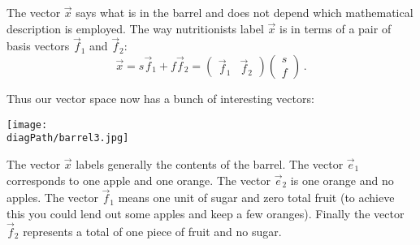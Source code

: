 {The vector $\vec x$ says what is in the barrel and does not depend which mathematical description is employed. The way nutritionists label $\vec x$ 
is in terms of a pair of basis vectors $\vec f_1$ and $\vec f_2$:
\[
\vec x=s \vec f_1 + f \vec f_2=\begin{pmatrix}\vec f_1 & \vec f_2\end{pmatrix}\begin{pmatrix}s \\ f\end{pmatrix}\, .
\]

Thus our vector space now has a bunch of interesting vectors:
\begin{center}
\texttt{[image: \\diagPath/barrel3.jpg]}
\end{center}
The vector $\vec x$ labels generally the contents of the barrel. The 
vector $\vec e_1$ corresponds to one apple and one orange. The vector $\vec e_2$ is one orange and no apples. The vector $\vec f_1$ means one unit of sugar and zero total fruit (to achieve this you could  lend out some apples and keep a few oranges). Finally the vector $\vec f_2$ represents a total of one piece of fruit and no sugar.

}
